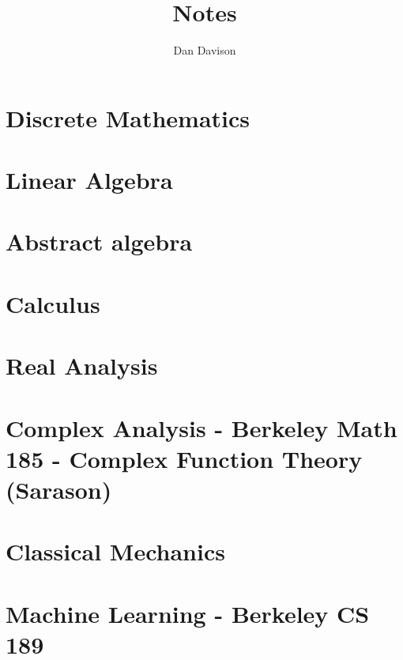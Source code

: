 \documentclass{book}
\title{Notes}
\author{Dan Davison}
\begin{document}
\frontmatter
\maketitle
\tableofcontents
\mainmatter

\chapter{Discrete Mathematics}


\chapter{Linear Algebra}


\chapter{Abstract algebra}


\chapter{Calculus}



\chapter{Real Analysis}


\chapter{Complex Analysis - Berkeley Math 185 - Complex Function Theory (Sarason)}


\chapter{Classical Mechanics}


\chapter{Machine Learning - Berkeley CS 189}


\end{document}
